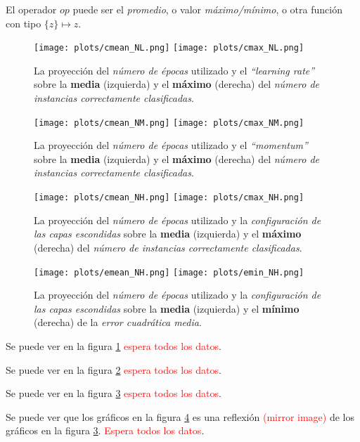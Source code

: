 \documentclass{article}
\newcommand{\red}[1]	    {\textcolor{red}{#1}}
\begin{document}
El operador $op$ puede ser el \emph{promedio}, o valor \emph{máximo/mínimo}, 
o otra función con tipo $\{z\} \mapsto z$.

\begin{figure}[h]
	\centering
	\texttt{[image: plots/cmean\_NL.png]}
	\texttt{[image: plots/cmax\_NL.png]}
	\caption{La proyección del \emph{número de épocas} utilizado y el \emph{``learning rate''} 
			 sobre la \textbf{media} (izquierda) y el \textbf{máximo} (derecha)
			 del \emph{número de instancias correctamente clasificadas}. 
			}
	\label{NL}
\end{figure}


\begin{figure}[h] 
	\centering
	\texttt{[image: plots/cmean\_NM.png]}
	\texttt{[image: plots/cmax\_NM.png]}
	\caption{La proyección del \emph{número de épocas} utilizado y el \emph{``momentum''} 
			 sobre la \textbf{media} (izquierda) y el \textbf{máximo} (derecha)
			 del \emph{número de instancias correctamente clasificadas}. 
			}
	\label{NM}
\end{figure}

\begin{figure}[h]
	\centering
	\texttt{[image: plots/cmean\_NH.png]}
	\texttt{[image: plots/cmax\_NH.png]}
	\caption{La proyección del \emph{número de épocas} utilizado y la
			 \emph{configuración de las capas escondidas} 
			 sobre la \textbf{media} (izquierda) y el \textbf{máximo} (derecha)
			 del \emph{número de instancias correctamente clasificadas}. 
			}
	\label{NHc}
\end{figure}
	
\begin{figure}[h] 
	\centering
	\texttt{[image: plots/emean\_NH.png]}
	\texttt{[image: plots/emin\_NH.png]}
	\caption{La proyección del \emph{número de épocas} utilizado y la
			 \emph{configuración de las capas escondidas} 
			 sobre la \textbf{media} (izquierda) y el \textbf{mínimo} (derecha)
			 de la \emph{error cuadrática media}. 
			}
	\label{NHe}
\end{figure}	



Se puede ver en la figura \ref{NL} \red{espera todos los datos}.

Se puede ver en la figura \ref{NM} \red{espera todos los datos}.

Se puede ver en la figura \ref{NHc} \red{espera todos los datos}.

Se puede ver que los gráficos en la figura \ref{NHe} es una reflexión \red{(mirror image)} de los gráficos en la figura \ref{NHc}.  \red{Espera todos los datos}.
			 
\end{document}
